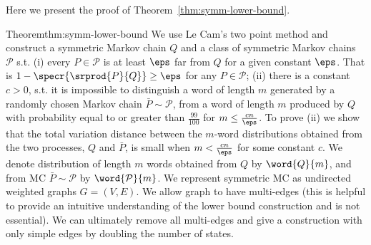 Here we present the proof of Theorem~\ref{thm:symm-lower-bound}.


\begin{prevproof}{Theorem}{thm:symm-lower-bound}
We use Le Cam's two point method and construct a symmetric Markov chain $Q$ and a class of symmetric Markov chains $\mathcal{P}$ s.t.  
(i) every $P \in \mathcal{P}$ is at least $\eps$ far from $Q$ for a given constant $\eps$. That is $1-\specr{\srprod{P}{Q}} \geq \eps$ for any $P \in \mathcal{P}$;
(ii) there is a constant $c > 0$, s.t. it is impossible to distinguish a word of length $m$ generated by a randomly chosen 
Markov chain $\bar{P} \sim \mathcal{P}$, from a word of length $m$ produced by $Q$ with probability equal to or greater than $\frac{99}{100}$ for $m\le\frac{cn}{\eps}$.
To prove (ii) we show that the total variation distance between the $m$-word distributions obtained from the two processes, $Q$ and $\bar{P}$, is small when $m<\frac{cn}{\eps}$ for 
some constant $c$. We denote distribution of length $m$ words obtained from $Q$ by $\word{Q}{m}$, and from MC $\bar{P}\sim\mathcal{P}$ by $\word{\mathcal{P}}{m}$. 
We represent symmetric MC as undirected weighted graphs $G=(V,E)$. 
We allow graph to have multi-edges (this is helpful to provide an intuitive understanding of the lower bound construction and is not 
essential). We can ultimately remove all multi-edges and give a construction with only simple edges by 
doubling the number of states.


\end{prevproof}

